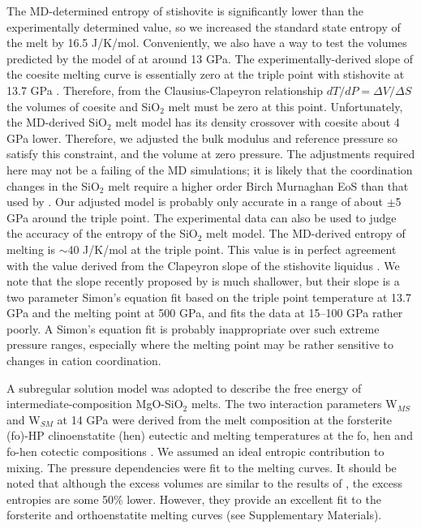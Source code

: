 \documentclass[review]{elsarticle}
\begin{document}
The MD-determined entropy of stishovite is significantly lower than the experimentally determined value, so we increased the standard state entropy of the melt by 16.5 J/K/mol. Conveniently, we also have a way to test the volumes predicted by the model of \cite{DKS2013} at around 13 GPa. The experimentally-derived slope of the coesite melting curve is essentially zero at the triple point with stishovite at 13.7 GPa \citep{ZLGHF1993}. Therefore, from the Clausius-Clapeyron relationship $dT/dP = \Delta V / \Delta S$ the volumes of coesite and SiO$_2$ melt must be zero at this point. Unfortunately, the MD-derived SiO$_2$ melt model has its density crossover with coesite about 4 GPa lower. Therefore, we adjusted the bulk modulus and reference pressure so satisfy this constraint, and the volume at zero pressure. The adjustments required here may not be a failing of the MD simulations; it is likely that the coordination changes in the SiO$_2$ melt require a higher order Birch Murnaghan EoS than that used by \citep{DKS2013}. Our adjusted model is probably only accurate in a range of about $\pm$5 GPa around the triple point. The experimental data can also be used to judge the accuracy of the entropy of the SiO$_2$ melt model. The MD-derived entropy of melting is $\sim$40 J/K/mol at the triple point. This value is in perfect agreement with the value derived from the Clapeyron slope of the stishovite liquidus \citep{SL1995}. We note that the slope recently proposed by \cite{Millotetal2015} is much shallower, but their slope is a two parameter Simon's equation fit based on the triple point temperature at 13.7 GPa and the melting point at 500 GPa, and fits the data at 15--100 GPa \citep{SL1995, LAM1983} rather poorly. A Simon's equation fit is probably inappropriate over such extreme pressure ranges, especially where the melting point may be rather sensitive to changes in cation coordination.

A subregular solution model was adopted to describe the free energy of intermediate-composition MgO-SiO$_2$ melts. The two interaction parameters W$_{MS}$ and W$_{SM}$ at 14 GPa were derived from the melt composition at the forsterite (fo)-HP clinoenstatite (hen) eutectic \citep{PWMW1998} and melting temperatures at the fo, hen and fo-hen cotectic compositions \citep{PG1990, PW1993}. We assumed an ideal entropic contribution to mixing. The pressure dependencies were fit to the melting curves. It should be noted that although the excess volumes are similar to the results of \cite{DKS2013}, the excess entropies are some 50\% lower. However, they provide an excellent fit to the forsterite and orthoenstatite melting curves (see Supplementary Materials).
\end{document}
